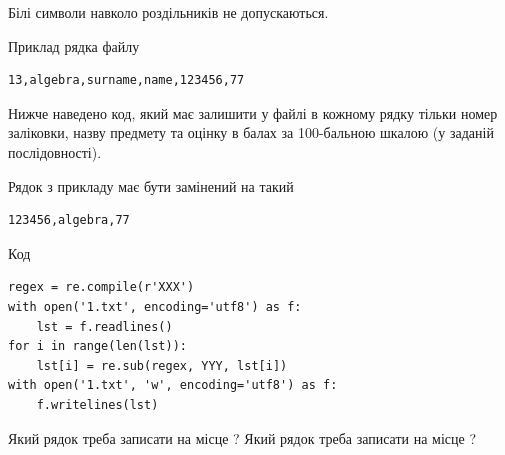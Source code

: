 \documentclass[12pt, ukrainian]{article}
\begin{document}
{Білі символи навколо роздільників не допускаються.

Приклад рядка файлу



\begin{verbatim}
13,algebra,surname,name,123456,77
\end{verbatim}


Нижче наведено код, який має залишити у файлі в кожному рядку тільки номер заліковки, назву предмету та оцінку в балах за 100-бальною шкалою (у заданій послі\-дов\-ності).

Рядок з прикладу має бути замінений на такий



\begin{verbatim}
123456,algebra,77
\end{verbatim}




Код



\begin{verbatim}
regex = re.compile(r'XXX')
with open('1.txt', encoding='utf8') as f:
    lst = f.readlines()
for i in range(len(lst)):
    lst[i] = re.sub(regex, YYY, lst[i])
with open('1.txt', 'w', encoding='utf8') as f:
    f.writelines(lst)
\end{verbatim}





Який рядок треба записати на місце  ?
Який рядок треба записати на місце  ?\par

}
\newpage
\end{document}
